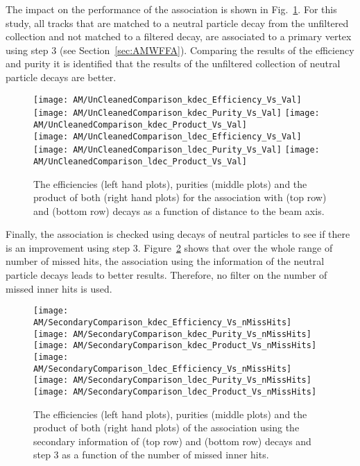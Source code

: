 The impact on the performance of the association is shown in Fig.~\ref{plot:AMWFSVdecEffAndPurRT}. For this study, all tracks that are matched to a neutral particle decay from the unfiltered collection and not matched to a filtered decay, are associated to a primary vertex using step 3 (see Section~\ref{sec:AMWFFA}). Comparing the results of the efficiency and purity it is identified that the results of the unfiltered collection of neutral particle decays are better.

\begin{figure}[!ht]
    \centering
    \texttt{[image: AM/UnCleanedComparison\_kdec\_Efficiency\_Vs\_Val]}
    \texttt{[image: AM/UnCleanedComparison\_kdec\_Purity\_Vs\_Val]}
    \texttt{[image: AM/UnCleanedComparison\_kdec\_Product\_Vs\_Val]}
    \\
    \texttt{[image: AM/UnCleanedComparison\_ldec\_Efficiency\_Vs\_Val]}
    \texttt{[image: AM/UnCleanedComparison\_ldec\_Purity\_Vs\_Val]}
    \texttt{[image: AM/UnCleanedComparison\_ldec\_Product\_Vs\_Val]}
    \caption[Efficiencies, purities and their product for the association with \PKzS{} and \PgL{} decays a function of distance to the beam axis]{The efficiencies (left hand plots), purities (middle plots) and the product of both (right hand plots) for the association with \PKzS{} (top row) and \PgL{} (bottom row) decays as a function of distance to the beam axis. \label{plot:AMWFSVdecEffAndPurRT}}
\end{figure}

Finally, the association is checked using decays of neutral particles to see if there is an improvement using step 3. Figure~\ref{plot:AMWFSVdecEffAndPurVsFA} shows that over the whole range of number of missed hits, the association using the information of the neutral particle decays leads to better results. Therefore, no filter on the number of missed inner hits is used.

\begin{figure}[!ht]
    \centering
    \texttt{[image: AM/SecondaryComparison\_kdec\_Efficiency\_Vs\_nMissHits]}
    \texttt{[image: AM/SecondaryComparison\_kdec\_Purity\_Vs\_nMissHits]}
    \texttt{[image: AM/SecondaryComparison\_kdec\_Product\_Vs\_nMissHits]}
    \\
    \texttt{[image: AM/SecondaryComparison\_ldec\_Efficiency\_Vs\_nMissHits]}
    \texttt{[image: AM/SecondaryComparison\_ldec\_Purity\_Vs\_nMissHits]}
    \texttt{[image: AM/SecondaryComparison\_ldec\_Product\_Vs\_nMissHits]}
    \caption[Efficiencies, purities and their product for the association with \PKzS{} and \PgL{} decays vs final association as a function of missed inner hits]{The efficiencies (left hand plots), purities (middle plots) and the product of both (right hand plots) of the association using the secondary information of \PKzS{} (top row) and \PgL{} (bottom row) decays and step 3 as a function of the number of missed inner hits.\label{plot:AMWFSVdecEffAndPurVsFA}}
\end{figure}

